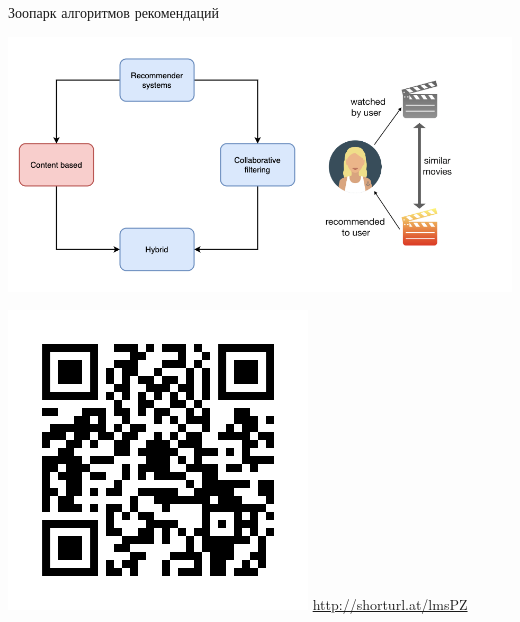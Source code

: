 \documentclass[11pt,aspectratio=169,handout]{beamer}
\begin{document}
\begin{frame}{Зоопарк алгоритмов рекомендаций \cite{ali_2021}}

\begin{center}
\includegraphics[scale=0.27]{images/taxonomy-2.png}
\end{center}

\includegraphics[scale=0.16]{images/poll.png} \hfill \url{http://shorturl.at/lmsPZ}

\end{frame}
\end{document}
